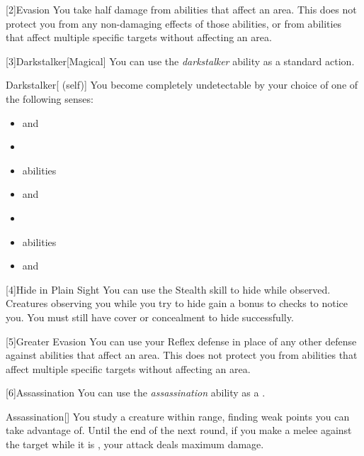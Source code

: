         [2]{Evasion} You take half damage from abilities that affect an area.
        This does not protect you from any non-damaging effects of those abilities, or from abilities that affect multiple specific targets without affecting an area.

        [3]{Darkstalker}[Magical] You can use the \textit{darkstalker} ability as a standard action.
        \begin{attuneability}{Darkstalker}[ (self)]
            You become completely undetectable by your choice of one of the following senses:
            \begin{itemize}
                \item {} and 
                \item {}
                \item {} abilities
                \item {} and 
                \item {}
                \item {} abilities
                \item {} and 
            \end{itemize}
        \end{attuneability}

        [4]{Hide in Plain Sight} You can use the Stealth skill to hide while observed.
        Creatures observing you while you try to hide gain a  bonus to checks to notice you.
        You must still have cover or concealment to hide successfully.

        [5]{Greater Evasion} You can use your Reflex defense in place of any other defense against abilities that affect an area.
        This does not protect you from abilities that affect multiple specific targets without affecting an area.

        [6]{Assassination} You can use the \textit{assassination} ability as a .
        \begin{freeability}{Assassination}[]
            You study a creature within \rngmed range, finding weak points you can take advantage of.
            Until the end of the next round, if you make a melee  against the target while it is \unaware, your attack deals maximum damage.
        \end{freeability}

